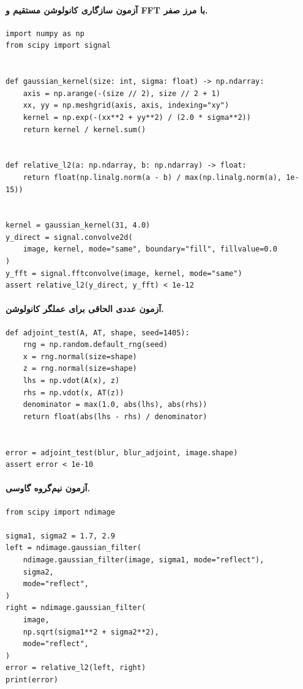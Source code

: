 \paragraph{آزمون سازگاری کانولوشن مستقیم و FFT با مرز صفر.}
\begin{LTR}
\begin{lstlisting}
import numpy as np
from scipy import signal


def gaussian_kernel(size: int, sigma: float) -> np.ndarray:
    axis = np.arange(-(size // 2), size // 2 + 1)
    xx, yy = np.meshgrid(axis, axis, indexing="xy")
    kernel = np.exp(-(xx**2 + yy**2) / (2.0 * sigma**2))
    return kernel / kernel.sum()


def relative_l2(a: np.ndarray, b: np.ndarray) -> float:
    return float(np.linalg.norm(a - b) / max(np.linalg.norm(a), 1e-15))


kernel = gaussian_kernel(31, 4.0)
y_direct = signal.convolve2d(
    image, kernel, mode="same", boundary="fill", fillvalue=0.0
)
y_fft = signal.fftconvolve(image, kernel, mode="same")
assert relative_l2(y_direct, y_fft) < 1e-12
\end{lstlisting}
\end{LTR}

\paragraph{آزمون عددی الحاقی برای عملگر کانولوشن.}
\begin{LTR}
\begin{lstlisting}
def adjoint_test(A, AT, shape, seed=1405):
    rng = np.random.default_rng(seed)
    x = rng.normal(size=shape)
    z = rng.normal(size=shape)
    lhs = np.vdot(A(x), z)
    rhs = np.vdot(x, AT(z))
    denominator = max(1.0, abs(lhs), abs(rhs))
    return float(abs(lhs - rhs) / denominator)


error = adjoint_test(blur, blur_adjoint, image.shape)
assert error < 1e-10
\end{lstlisting}
\end{LTR}

\paragraph{آزمون نیم‌گروه گاوسی.}
\begin{LTR}
\begin{lstlisting}
from scipy import ndimage

sigma1, sigma2 = 1.7, 2.9
left = ndimage.gaussian_filter(
    ndimage.gaussian_filter(image, sigma1, mode="reflect"),
    sigma2,
    mode="reflect",
)
right = ndimage.gaussian_filter(
    image,
    np.sqrt(sigma1**2 + sigma2**2),
    mode="reflect",
)
error = relative_l2(left, right)
print(error)
\end{lstlisting}
\end{LTR}

